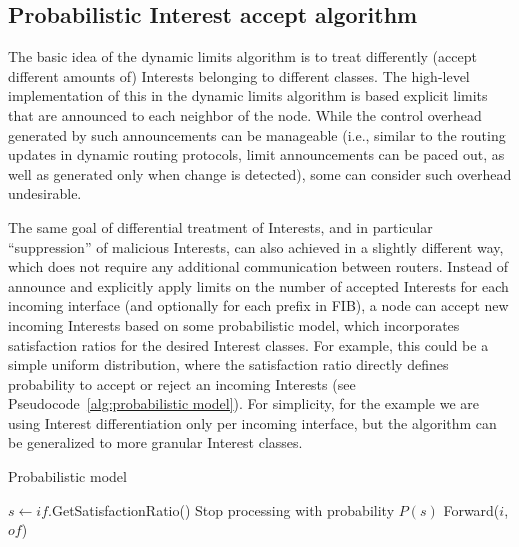 \subsection{Probabilistic Interest accept algorithm}
\label{sec:probabilistic}

The basic idea of the dynamic limits algorithm is to treat differently (accept different amounts of) Interests belonging to different classes.
The high-level implementation of this in the dynamic limits algorithm is based explicit limits that are announced to each neighbor of the node.
While the control overhead generated by such announcements can be manageable (i.e., similar to the routing updates in dynamic routing protocols, limit announcements can be paced out, as well as generated only when change is detected), some can consider such overhead undesirable.

The same goal of differential treatment of Interests, and in particular ``suppression'' of malicious Interests, can also achieved in a slightly different way, which does not require any additional communication between routers.
Instead of announce and explicitly apply limits on the number of accepted Interests for each incoming interface (and optionally for each prefix in FIB), a node can accept new incoming Interests based on some probabilistic model, which incorporates satisfaction ratios for the desired Interest classes.
For example, this could be a simple uniform distribution, where the satisfaction ratio directly defines probability to accept or reject an incoming Interests (see Pseudocode~\ref{alg:probabilistic model}).
For simplicity, for the example we are using Interest differentiation only per incoming interface, but the algorithm can be generalized to more granular Interest classes.



\begin{algorithm}[h]
\caption{Probabilistic model}
\label{alg:probabilistic model}
\begin{algorithmic}[1]


    \State{} 
    \State{} 
    
        \State $s \leftarrow if$.GetSatisfactionRatio()
         
            \State Stop processing with probability $P(s)$
        \EndIf
            \State Forward($i$, $of$)
        \EndIf
    \EndFor
\EndFunction

\end{algorithmic}
\end{algorithm}


